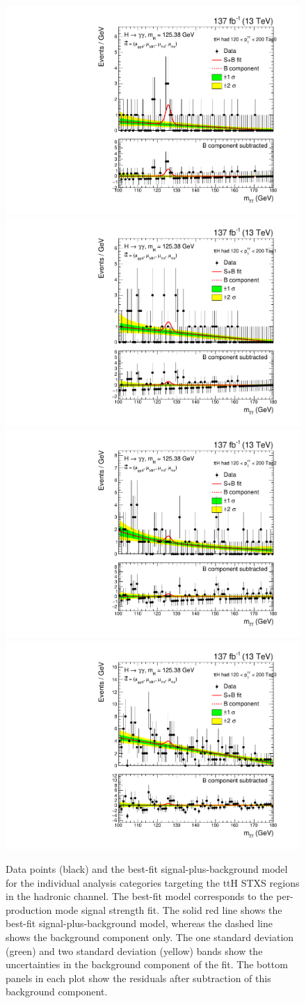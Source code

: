 \begin{figure}[htbp]
  \includegraphics[width=.32\linewidth]{Figures/app_sb_models/RECO_TTH_HAD_PTH_120_200_Tag0_CMS_hgg_mass.pdf}
  \includegraphics[width=.32\linewidth]{Figures/app_sb_models/RECO_TTH_HAD_PTH_120_200_Tag1_CMS_hgg_mass.pdf}
  \includegraphics[width=.32\linewidth]{Figures/app_sb_models/RECO_TTH_HAD_PTH_120_200_Tag2_CMS_hgg_mass.pdf}
  \includegraphics[width=.32\linewidth]{Figures/app_sb_models/RECO_TTH_HAD_PTH_120_200_Tag3_CMS_hgg_mass.pdf}
  \caption[Observed diphoton mass distributions: ttH]
  {
    Data points (black) and the best-fit signal-plus-background model for the individual analysis categories targeting the ttH STXS regions in the hadronic channel. The best-fit model corresponds to the per-production mode signal strength fit. The solid red line shows the best-fit signal-plus-background model, whereas the dashed line shows the background component only. The one standard deviation (green) and two standard deviation (yellow) bands show the uncertainties in the background component of the fit. The bottom panels in each plot show the residuals after subtraction of this background component.
  }
  \label{fig:diphoton_mass_5}
\end{figure}

